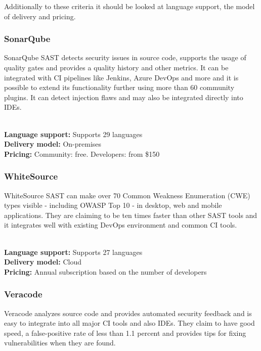 \documentclass[conference]{IEEEtran}
\begin{document}
Additionally to these criteria it should be looked at language support, the model of delivery and pricing.\\

\noindent
\subsubsection{SonarQube \cite{sast1}}

SonarQube SAST detects security issues in source code, supports the usage of quality gates and provides a quality history and other metrics. It can be integrated with CI pipelines like Jenkins, Azure DevOps and more and it is possible to extend its functionality further using more than 60 community plugins. It can detect injection flaws and may also be integrated directly into IDEs. 

\noindent\\
\textbf{Language support:} Supports 29 languages
\noindent\\
\textbf{Delivery model:} On-premises
\noindent\\
\textbf{Pricing:} Community: free. Developers: from \$150
\\

\noindent
\subsubsection{WhiteSource \cite{sast2}}

WhiteSource SAST can make over 70 Common Weakness Enumeration (CWE) types visible - including OWASP Top 10 - in desktop, web and mobile applications. They are claiming to be ten times faster than other SAST tools and it integrates well with existing DevOps environment and common CI tools.

\noindent\\
\textbf{Language support:} Supports 27 languages
\noindent\\
\textbf{Delivery model:} Cloud
\noindent\\
\textbf{Pricing:} Annual subscription based on the number of developers
\\

\noindent
\subsubsection{Veracode \cite{sast3}}

Veracode analyzes source code and provides automated security feedback and is easy to integrate into all major CI tools and also IDEs. They claim to have good speed, a false-positive rate of less than 1.1 percent and provides tips for fixing vulnerabilities when they are found.
\end{document}
